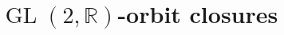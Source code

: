 \documentclass[a4paper,12pt]{article}
\def\bR{\mathbb{R}}
\def\cA{\mathcal{A}}
\def\cE{\mathcal{E}}
\def\GL{\operatorname{GL}}
\begin{document}
%
%
%
%


%
%
%
%


\section{$\GL(2,\bR)$-orbit closures}
\end{document}
